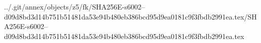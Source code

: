 ../.git/annex/objects/z5/fk/SHA256E-s6002--d09d8bd3d14b751b51481da53e94b480eb386bcd95d9ea0181c9f3fbdb2991ea.tex/SHA256E-s6002--d09d8bd3d14b751b51481da53e94b480eb386bcd95d9ea0181c9f3fbdb2991ea.tex